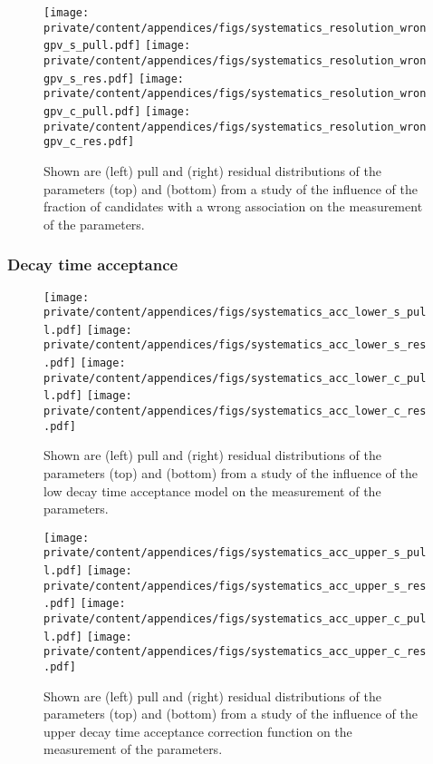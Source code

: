 \begin{figure}[h]
  \texttt{[image: private/content/appendices/figs/systematics\_resolution\_wrongpv\_s\_pull.pdf]}\hfill
  \texttt{[image: private/content/appendices/figs/systematics\_resolution\_wrongpv\_s\_res.pdf]}
  \texttt{[image: private/content/appendices/figs/systematics\_resolution\_wrongpv\_c\_pull.pdf]}\hfill
  \texttt{[image: private/content/appendices/figs/systematics\_resolution\_wrongpv\_c\_res.pdf]}
\caption{Shown are (left) pull and (right) residual distributions of the
parameters (top) \SJpsiKS and (bottom) \CJpsiKS from a \ToyMC study of the
influence of the fraction of candidates with a wrong \PV association on the
measurement of the \CP parameters.}
\label{fig:app:measurement_of_sin2beta:systematics:systematics:resolution:wrong_pv}
\end{figure}

\FloatBarrier
\subsubsection{Decay time acceptance}
\label{sec:app:measurement_of_sin2beta:systematics:systematics:acceptance}

\begin{figure}[h]
  \texttt{[image: private/content/appendices/figs/systematics\_acc\_lower\_s\_pull.pdf]}\hfill
  \texttt{[image: private/content/appendices/figs/systematics\_acc\_lower\_s\_res.pdf]}
  \texttt{[image: private/content/appendices/figs/systematics\_acc\_lower\_c\_pull.pdf]}\hfill
  \texttt{[image: private/content/appendices/figs/systematics\_acc\_lower\_c\_res.pdf]}
\caption{Shown are (left) pull and (right) residual distributions of the
parameters (top) \SJpsiKS and (bottom) \CJpsiKS from a \ToyMC study of the
influence of the low decay time acceptance model on the measurement of the \CP
parameters.}
\label{fig:app:measurement_of_sin2beta:systematics:systematics:acceptance:lower}
\end{figure}

\begin{figure}[h]
  \texttt{[image: private/content/appendices/figs/systematics\_acc\_upper\_s\_pull.pdf]}\hfill
  \texttt{[image: private/content/appendices/figs/systematics\_acc\_upper\_s\_res.pdf]}
  \texttt{[image: private/content/appendices/figs/systematics\_acc\_upper\_c\_pull.pdf]}\hfill
  \texttt{[image: private/content/appendices/figs/systematics\_acc\_upper\_c\_res.pdf]}
\caption{Shown are (left) pull and (right) residual distributions of the
parameters (top) \SJpsiKS and (bottom) \CJpsiKS from a \ToyMC study of the
influence of the upper decay time acceptance correction function on the
measurement of the \CP parameters.}
\label{fig:app:measurement_of_sin2beta:systematics:systematics:acceptance:upper}
\end{figure}

